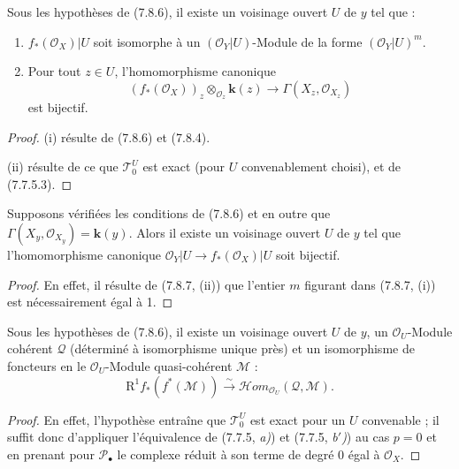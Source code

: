 \begin{corollary}[7.8.7]
Sous les hypothèses de \textup{(7.8.6)}, il existe un voisinage ouvert $U$ de $y$ tel
que :
\begin{enumerate}
  \item[\textup{(i)}] $f_*(\mathscr O_X)|U$ soit isomorphe à un
    $(\mathscr O_Y|U)$-Module de la forme $(\mathscr O_Y|U)^m$.
  \item[\textup{(ii)}] Pour tout $z\in U$, l'homomorphisme canonique
    \[
      (f_*(\mathscr O_X))_z
      \otimes_{\mathscr O_z}\boldsymbol{k}(z)
      \longrightarrow
      \Gamma(X_z,\mathscr O_{X_z})
    \]
    est bijectif.
\end{enumerate}
\end{corollary}

\begin{proof}
(i) résulte de (7.8.6) et (7.8.4).

(ii) résulte de ce que $\mathscr T_0^U$ est exact (pour $U$ convenablement
choisi), et de (7.7.5.3).
\end{proof}

\begin{corollary}[7.8.8]
Supposons vérifiées les conditions de \textup{(7.8.6)} et en outre que
$\Gamma(X_y,\mathscr O_{X_y})=\boldsymbol{k}(y)$. Alors il existe un voisinage ouvert
$U$ de $y$ tel que l'homomorphisme canonique
$\mathscr O_Y|U\to f_*(\mathscr O_X)|U$ soit bijectif.
\end{corollary}

\begin{proof}
En effet, il résulte de (7.8.7, (ii)) que l'entier $m$ figurant dans (7.8.7,
(i)) est nécessairement égal à 1.
\end{proof}

\begin{corollary}[7.8.9]
Sous les hypothèses de \textup{(7.8.6)}, il existe un voisinage ouvert $U$ de $y$, un
$\mathscr O_U$-Module cohérent $\mathscr Q$ (déterminé à isomorphisme unique
près) et un isomorphisme de foncteurs en le $\mathscr O_U$-Module quasi-cohérent
$\mathscr M$ :
\[
  \mathrm R^1f_*(f^*(\mathscr M))
  \xrightarrow{\sim}
  \mathscr{H}\!om_{\mathscr O_U}(\mathscr Q,\mathscr M).
  \tag{7.8.9.1}\label{III.7.8.9.1.fr}
\]
\end{corollary}

\begin{proof}
En effet, l'hypothèse entraîne que $\mathscr T_0^U$ est exact pour un $U$
convenable ; il suffit donc d'appliquer l'équivalence de (7.7.5, \emph{a)}) et
(7.7.5, \emph{b$'$)}) au cas $p=0$ et en prenant pour $\mathscr P_\bullet$ le complexe
réduit à son terme de degré 0 égal à $\mathscr O_X$.
\end{proof}

